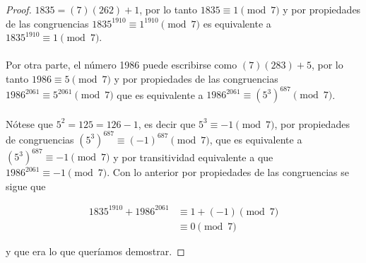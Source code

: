 \documentclass{article}
\begin{document}
\begin{proof}
$1835 = (7)(262) + 1$, por lo tanto $1835 \equiv 1 \pmod{7}$ y por propiedades de las congruencias $1835^{1910} \equiv 1^{1910} \pmod{7}$ es equivalente a $1835^{1910} \equiv 1 \pmod{7}$.

\paragraph{} Por otra parte, el número 1986 puede escribirse como $(7)(283) + 5$, por lo tanto $1986 \equiv 5 \pmod{7}$ y por propiedades de las congruencias $1986^{2061} \equiv 5^{2061} \pmod{7}$ que es equivalente a $1986^{2061} \equiv (5^3)^{687} \pmod{7}$.

\paragraph{}Nótese que $5^2 = 125 = 126 - 1$, es decir que $5^3 \equiv -1 \pmod{7}$, por propiedades de congruencias $(5^3)^{687} \equiv (-1)^{687} \pmod{7}$, que es equivalente a $(5^3)^{687} \equiv -1 \pmod{7}$ y por transitividad equivalente a que $1986^{2061} \equiv -1 \pmod{7}$. Con lo anterior por propiedades de las congruencias se sigue que

\begin{align*}
1835^{1910} + 1986^{2061} &\equiv 1 + (-1) \pmod{7}\\
&\equiv 0 \pmod{7}
\end{align*}

y que era lo que queríamos demostrar.

\end{proof}

\nocite{*}


\end{document}
